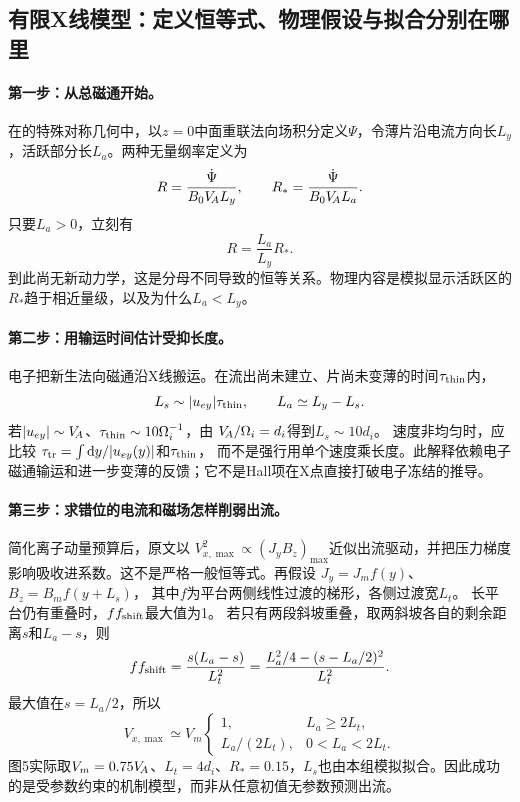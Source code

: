 \subsection{有限X线模型：定义恒等式、物理假设与拟合分别在哪里}\label{sec:synthesis-length-model}
\paragraph{第一步：从总磁通开始。}
在\citet{F792}的特殊对称几何中，以$z=0$中面重联法向场积分定义$\Psi$，令薄片沿电流方向长$L_y$，活跃部分长$L_a$。两种无量纲率定义为
\begin{equation}
R=\frac{\dot\Psi}{B_0V_{\!A} L_y},\qquad
R_*=\frac{\dot\Psi}{B_0V_{\!A} L_a}.
\end{equation}
只要$L_a>0$，立刻有
\begin{equation}
R=\frac{L_a}{L_y}R_* .
\label{eq:synthesis-active}
\end{equation}
到此尚无新动力学，这是分母不同导致的恒等关系。物理内容是模拟显示活跃区的$R_*$趋于相近量级，以及为什么$L_a<L_y$。

\paragraph{第二步：用输运时间估计受抑长度。}
电子把新生法向磁通沿X线搬运。在流出尚未建立、片尚未变薄的时间$\tau_{\rm thin}$内，
\begin{equation}
L_s\sim |u_{ey}|\tau_{\rm thin},\qquad L_a\simeq L_y-L_s.
\end{equation}
若$|u_{ey}|\sim V_{\!A}$、$\tau_{\rm thin}\sim10\Omega_i^{-1}$，由
$V_{\!A}/\Omega_i=d_i$得到$L_s\sim10d_i$。
速度非均匀时，应比较
$\tau_{\rm tr}=\int\mathrm d y/|u_{ey}(y)|$和$\tau_{\rm thin}$，
而不是强行用单个速度乘长度。此解释依赖电子磁通输运和进一步变薄的反馈；它不是Hall项在X点直接打破电子冻结的推导。\citep{F659}

\paragraph{第三步：求错位的电流和磁场怎样削弱出流。}
简化离子动量预算后，原文以
$V_{x,\max}^2\propto(J_yB_z)_{\max}$近似出流驱动，并把压力梯度影响吸收进系数。这不是严格一般恒等式。再假设
$J_y=J_m f(y)$、$B_z=B_m f(y+L_s)$，
其中$f$为平台两侧线性过渡的梯形，各侧过渡宽$L_t$。
长平台仍有重叠时，$f f_{\rm shift}$最大值为1。
若只有两段斜坡重叠，取两斜坡各自的剩余距离$s$和$L_a-s$，则
\begin{equation}
f f_{\rm shift}=\frac{s(L_a-s)}{L_t^2}
=\frac{L_a^2/4-(s-L_a/2)^2}{L_t^2}.
\end{equation}
最大值在$s=L_a/2$，所以
\begin{equation}
V_{x,\max}\simeq V_m
\begin{cases}
1,& L_a\geq2L_t,\\
L_a/(2L_t),&0<L_a<2L_t.
\end{cases}
\end{equation}
图5实际取$V_m=0.75V_{\!A}$、$L_t=4d_i$、$R_*=0.15$，$L_s$也由本组模拟拟合。因此成功的是受参数约束的机制模型，而非从任意初值无参数预测出流。

